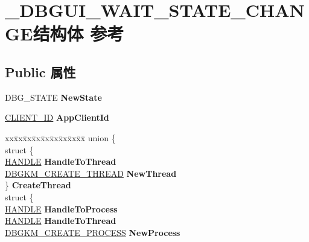 \hypertarget{struct___d_b_g_u_i___w_a_i_t___s_t_a_t_e___c_h_a_n_g_e}{}\section{\+\_\+\+D\+B\+G\+U\+I\+\_\+\+W\+A\+I\+T\+\_\+\+S\+T\+A\+T\+E\+\_\+\+C\+H\+A\+N\+G\+E结构体 参考}
\label{struct___d_b_g_u_i___w_a_i_t___s_t_a_t_e___c_h_a_n_g_e}
\subsection*{Public 属性}
\begin{DoxyCompactItemize}
\item 
\mbox{\label{struct___d_b_g_u_i___w_a_i_t___s_t_a_t_e___c_h_a_n_g_e_ac31617d8d5c2b3f675c3e65cd0320aed}} 
D\+B\+G\+\_\+\+S\+T\+A\+TE {\bfseries New\+State}
\item 
\mbox{\label{struct___d_b_g_u_i___w_a_i_t___s_t_a_t_e___c_h_a_n_g_e_a8836dc457dbf4ed8bc573f74e9e5d301}} 
\hyperlink{struct___c_l_i_e_n_t___i_d}{C\+L\+I\+E\+N\+T\+\_\+\+ID} {\bfseries App\+Client\+Id}
\item 
\mbox{\label{struct___d_b_g_u_i___w_a_i_t___s_t_a_t_e___c_h_a_n_g_e_af4699efd0a649d9c8e5548457e011075}} 
\begin{tabbing}
xx\=xx\=xx\=xx\=xx\=xx\=xx\=xx\=xx\=\kill
union \{\\
\>struct \{\\
\>\>\hyperlink{interfacevoid}{HANDLE} {\bfseries HandleToThread}\\
\>\>\hyperlink{struct___d_b_g_k_m___c_r_e_a_t_e___t_h_r_e_a_d}{DBGKM\_CREATE\_THREAD} {\bfseries NewThread}\\
\>\} {\bfseries CreateThread}\\
\>struct \{\\
\>\>\hyperlink{interfacevoid}{HANDLE} {\bfseries HandleToProcess}\\
\>\>\hyperlink{interfacevoid}{HANDLE} {\bfseries HandleToThread}\\
\>\>\hyperlink{struct___d_b_g_k_m___c_r_e_a_t_e___p_r_o_c_e_s_s}{DBGKM\_CREATE\_PROCESS} {\bfseries NewProcess}\\

\end{tabbing}
\end{DoxyCompactItemize}
